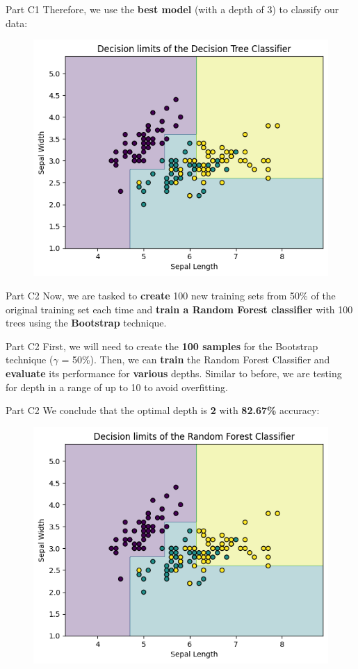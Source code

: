 \documentclass{beamer}
\begin{document}
    \begin{frame}{Part C1}
        Therefore, we use the \textbf{best model} (with a depth of 3) to classify our data:
        \begin{figure}
        \centering
        \includegraphics[width=0.65\linewidth]{C1.png}
        \label{Graph C1}
    \end{figure}
    \end{frame}

    \begin{frame}{Part C2}
       Now, we are tasked to \textbf{create} 100 new training sets from 50\% of the original training set each time and \textbf{train a Random Forest classifier} with 100 trees using the \textbf{Bootstrap} technique.
    \end{frame}

    \begin{frame}{Part C2}
       First, we will need to create the \textbf{100 samples} for the Bootstrap technique ($\gamma$ = 50\%).
       \hfill\break\hfill\break
       Then, we can \textbf{train} the Random Forest Classifier and \textbf{evaluate} its performance for \textbf{various} depths. Similar to before, we are testing for depth in a range of up to 10 to avoid overfitting.
    \end{frame}

    \begin{frame}{Part C2}
        We conclude that the optimal depth is \textbf{2} with \textbf{82.67\%} accuracy:
        \begin{figure}
        \centering
        \includegraphics[width=0.65\linewidth]{C2.png}
        \label{Graph C2}
    \end{figure}
    \end{frame}
\end{document}
